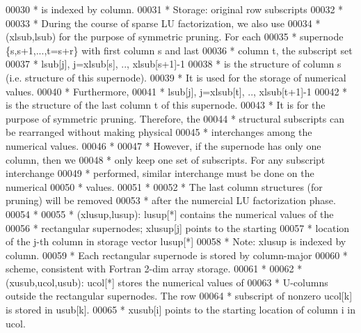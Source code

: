 \begin{DoxyCode}
00030 \textcolor{comment}{ *  is indexed by column.}
00031 \textcolor{comment}{ *  Storage: original row subscripts}
00032 \textcolor{comment}{ *}
00033 \textcolor{comment}{ *      During the course of sparse LU factorization, we also use}
00034 \textcolor{comment}{ *  (xlsub,lsub) for the purpose of symmetric pruning. For each}
00035 \textcolor{comment}{ *  supernode \{s,s+1,...,t=s+r\} with first column s and last}
00036 \textcolor{comment}{ *  column t, the subscript set}
00037 \textcolor{comment}{ *    lsub[j], j=xlsub[s], .., xlsub[s+1]-1}
00038 \textcolor{comment}{ *  is the structure of column s (i.e. structure of this supernode).}
00039 \textcolor{comment}{ *  It is used for the storage of numerical values.}
00040 \textcolor{comment}{ *  Furthermore,}
00041 \textcolor{comment}{ *    lsub[j], j=xlsub[t], .., xlsub[t+1]-1}
00042 \textcolor{comment}{ *  is the structure of the last column t of this supernode.}
00043 \textcolor{comment}{ *  It is for the purpose of symmetric pruning. Therefore, the}
00044 \textcolor{comment}{ *  structural subscripts can be rearranged without making physical}
00045 \textcolor{comment}{ *  interchanges among the numerical values.}
00046 \textcolor{comment}{ *}
00047 \textcolor{comment}{ *  However, if the supernode has only one column, then we}
00048 \textcolor{comment}{ *  only keep one set of subscripts. For any subscript interchange}
00049 \textcolor{comment}{ *  performed, similar interchange must be done on the numerical}
00050 \textcolor{comment}{ *  values.}
00051 \textcolor{comment}{ *}
00052 \textcolor{comment}{ *  The last column structures (for pruning) will be removed}
00053 \textcolor{comment}{ *  after the numercial LU factorization phase.}
00054 \textcolor{comment}{ *}
00055 \textcolor{comment}{ *   (xlusup,lusup): lusup[*] contains the numerical values of the}
00056 \textcolor{comment}{ *  rectangular supernodes; xlusup[j] points to the starting}
00057 \textcolor{comment}{ *  location of the j-th column in storage vector lusup[*]}
00058 \textcolor{comment}{ *  Note: xlusup is indexed by column.}
00059 \textcolor{comment}{ *  Each rectangular supernode is stored by column-major}
00060 \textcolor{comment}{ *  scheme, consistent with Fortran 2-dim array storage.}
00061 \textcolor{comment}{ *}
00062 \textcolor{comment}{ *   (xusub,ucol,usub): ucol[*] stores the numerical values of}
00063 \textcolor{comment}{ *  U-columns outside the rectangular supernodes. The row}
00064 \textcolor{comment}{ *  subscript of nonzero ucol[k] is stored in usub[k].}
00065 \textcolor{comment}{ *  xusub[i] points to the starting location of column i in ucol.}

\end{DoxyCode}
